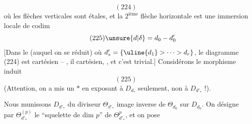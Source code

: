 \[
(224)
\]
où les flèches verticales sont étales,
et la $2^{\mathrm{ième}}$ flèche horizontale est une
immersion locale de codim 
\[
\tag{225}\unsure{d|\delta}=d_0-d'_0
\]
[Dans le  (auquel on se réduit)
où $d'_* = \{\uline{d_1}>\cdots>d_r\}$, le diagramme
(224) est cartésien -- , il
  cartésien, , et c'est trivial.]
Considérons le morphisme induit
\[
(225)
\]
(Attention, on a mis un $*$ en exposant
à $D_{d_*}$ seulement, non à $D_{d'_*}$ !).

Nous munissons $D_{d'_*}$ du diviseur
$\Theta_{d'_*}$ image inverse de $\Theta_{d_0}$ sur $D_{d_0}$.
On désigne par $\Theta_{d'_*}^{(p)}$ le ``squelette
de dim $p$'' de $\Theta_{d'_*}^{p}$, et  on pose
